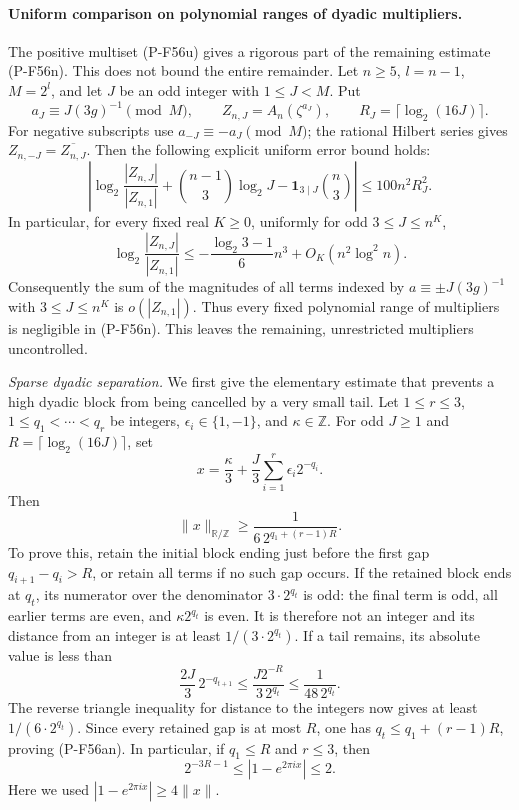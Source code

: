 \paragraph{Uniform comparison on polynomial ranges of dyadic multipliers.}
The positive multiset (P-F56u) gives a rigorous part of the
remaining estimate (P-F56n). This does not bound the entire
remainder. Let $n\ge5$, $l=n-1$, $M=2^l$, and let $J$ be an
odd integer with $1\le J<M$. Put
\[
 a_J\equiv J(3g)^{-1}\pmod M,\qquad
 Z_{n,J}=A_n(\zeta^{a_J}),\qquad
 R_J=\lceil\log_2(16J)\rceil.
 \tag{P-F56ak}
\]
For negative subscripts use $a_{-J}\equiv-a_J\pmod M$;
the rational Hilbert series gives
$Z_{n,-J}=\overline{Z_{n,J}}$.
Then the following explicit uniform error bound holds:
\[
 \left|\log_2\frac{|Z_{n,J}|}{|Z_{n,1}|}
       +\binom{n-1}{3}\log_2J
       -\mathbf1_{3\mid J}\binom n3\right|
       \le 100n^2R_J^2.
 \tag{P-F56al}
\]
In particular, for every fixed real $K\ge0$, uniformly for
odd $3\le J\le n^K$,
\[
 \log_2\frac{|Z_{n,J}|}{|Z_{n,1}|}
 \le -\frac{\log_2 3-1}{6}n^3
                         +O_K(n^2\log^2 n).
 \tag{P-F56am}
\]
Consequently the sum of the magnitudes of all terms indexed
by $a\equiv\pm J(3g)^{-1}$ with $3\le J\le n^K$ is
$o(|Z_{n,1}|)$. Thus every fixed polynomial range of
multipliers is negligible in (P-F56n). This leaves the
remaining, unrestricted multipliers uncontrolled.

\emph{Sparse dyadic separation.}
We first give the elementary estimate that prevents a high
dyadic block from being cancelled by a very small tail.
Let $1\le r\le3$, $1\le q_1<\cdots<q_r$ be integers,
$\epsilon_i\in\{1,-1\}$, and $\kappa\in\mathbb Z$.
For odd $J\ge1$ and $R=\lceil\log_2(16J)\rceil$, set
\[
 x=\frac\kappa3+
              \frac J3\sum_{i=1}^r\epsilon_i2^{-q_i}.
\]
Then
\[
 \|x\|_{\mathbb R/\mathbb Z}
       \ge\frac1{6\,2^{q_1+(r-1)R}}.
 \tag{P-F56an}
\]
To prove this, retain the initial block ending just before
the first gap $q_{i+1}-q_i>R$, or retain all terms if no
such gap occurs. If the retained block ends at $q_t$, its
numerator over the denominator $3\cdot2^{q_t}$ is odd:
the final term is odd, all earlier terms are even, and
$\kappa2^{q_t}$ is even. It is therefore not an integer
and its distance from an integer is at least
$1/(3\cdot2^{q_t})$.
If a tail remains, its absolute value is less than
\[
 \frac{2J}{3}\,2^{-q_{t+1}}
 \le\frac{J2^{-R}}{3\,2^{q_t}}
 \le\frac1{48\,2^{q_t}}.
\]
The reverse triangle inequality for distance to the
integers now gives at least $1/(6\cdot2^{q_t})$.
Since every retained gap is at most $R$, one has
$q_t\le q_1+(r-1)R$, proving (P-F56an).
In particular, if $q_1\le R$ and $r\le3$, then
\[
 2^{-3R-1}\le |1-e^{2\pi ix}|\le2.
 \tag{P-F56ao}
\]
Here we used $|1-e^{2\pi ix}|\ge4\|x\|$.

